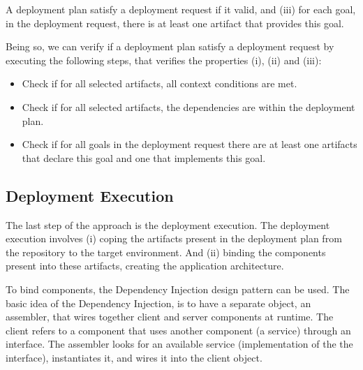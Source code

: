A deployment plan satisfy a deployment request if it valid, and (iii) for each goal, in the deployment request, there is at least one artifact that provides this goal.

Being so, we can verify if a deployment plan satisfy a deployment request by executing the following steps, that verifies the properties (i), (ii) and (iii):

\begin{itemize}
  \item Check if for all selected artifacts, all context conditions are met.
  \item Check if for all selected artifacts, the dependencies are within the deployment plan.
  \item Check if for all goals in the deployment request there are at least one artifacts that declare this goal and one that implements this goal.
\end{itemize}

\subsection{Deployment Execution}

The last step of the approach is the deployment execution. The deployment execution involves (i) coping the artifacts present in the deployment plan from the repository to the target environment. And (ii) binding the components present into these artifacts, creating the application architecture.

To bind components, the Dependency Injection design pattern can be used. The basic idea of the Dependency Injection, is to have a separate object, an assembler, that wires together client and server components at runtime\cite{fowler_inversion_2004}. The client refers to a component that uses another component (a service) through an interface. The assembler looks for an available service (implementation of the the interface), instantiates it, and wires it into the client object.
